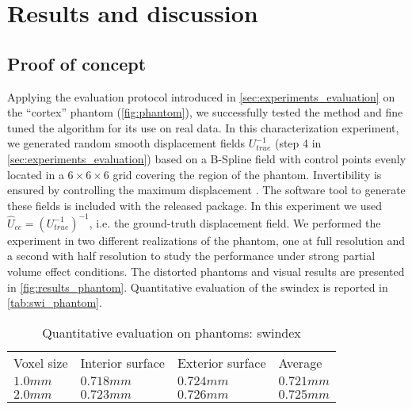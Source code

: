 \section*{Results and discussion}
\label{sec:results}

\subsection*{Proof of concept}
\label{sec:results_phantom}

Applying the evaluation protocol introduced in \autoref{sec:experiments_evaluation} on
  the ``cortex'' phantom (\autoref{fig:phantom}), we successfully tested the method and
  fine tuned the algorithm for its use on real data.
In this characterization experiment, we generated random smooth displacement fields $U^{-1}_{true}$
  (step 4 in \autoref{sec:experiments_evaluation}) based on a B-Spline field with
  control points evenly located in a $6 \times 6 \times 6$ grid covering the region of the phantom.
Invertibility is ensured by controlling the maximum	displacement
  \citep{rueckert_diffeomorphic_2006}.
The software tool to generate these fields is included with the released package.
In this experiment we used $\hat{U}_{cc} = (U^{-1}_{true})^{-1}$, i.e. the ground-truth
  displacement field.
We performed the experiment in two different realizations of the phantom, one at full resolution
  and a second with half resolution to study the performance under strong partial volume effect
  conditions.
The distorted phantoms and visual results are presented in \autoref{fig:results_phantom}.
Quantitative evaluation of the \gls*{swindex} is reported in \autoref{tab:swi_phantom}.

\begin{table}
	\caption{Quantitative evaluation on phantoms: \acrlong*{swindex}}
	\label{tab:swi_phantom}
    \begin{tabular}{llll}
    Voxel size  & Interior surface & Exterior surface & Average \\
    $1.0mm$ & $0.718mm$            & $0.724mm$            & $0.721mm$   \\
    $2.0mm$ & $0.723mm$            & $0.726mm$            & $0.725mm$   \\
    \end{tabular}
\end{table}

